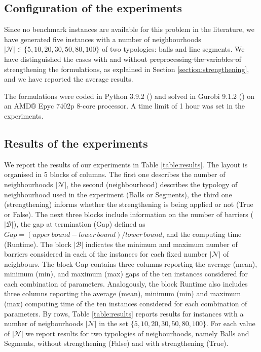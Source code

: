 \documentclass[a4paper,  review, authoryear, 1p.]{elsarticle}
\newcommand{\CV}[1]{{\color{red}#1}}
\begin{document}
	\subsection{Configuration of the experiments}
	Since no benchmark instances are available for this problem in the literature, we have generated five instances with a number of neighbourhoods $|\mathcal N|\in\{5, 10, 20, 30, 50, 80, 100\}$ of two typologies: balls and line segments. We have distinguished the cases with and without \sout{preprocessing the variables of} \CV{strengthening} the formulations, as explained in Section \ref{section:strengthening}, and we have reported the average results. 
	
	The formulations were coded in Python 3.9.2 (\citet{g_van_rossum_guido_python_1995}) and solved in Gurobi 9.1.2 (\citet{gurobi_optimization_llc_gurobi_2022}) on an AMD® Epyc 7402p 8-core processor. A time limit of 1 hour was set in the experiments.
	
	\subsection{Results of the experiments}
	We report the results of our experiments in Table \ref{table:results}. The layout is organised in 5 blocks of columns. The first one describes the number of neighbourhoods $|\mathcal{N}|$, the second (neighbourhood) describes the typology of neighbourhood used in the experiment (Balls or Segments), the third one (strengthening)  informs whether the strengthening is being applied or not (True or False). The next three blocks include information  on the number of barriers ($|\mathcal{B}|$), the  gap at termination (Gap) defined as $Gap=(upper\, bound - lower\, bound)/lower\, bound$, and the computing time (Runtime). The block $|\mathcal{B}|$ indicates the minimum and maximum number of barriers considered in each of the instances for each fixed number $|\mathcal{N}|$ of neighbours. The block Gap contains three columns reporting the average (mean), minimum (min), and maximum (max) gaps of the ten instances considered for each combination of parameters. Analogously, the block Runtime also includes three columns reporting the average (mean), minimum (min) and maximum (max) computing time of the ten instances considered for each combination of parameters.
	By rows, Table \ref{table:results} reports results for instances with a number of neigbourhoods $|\mathcal{N}|$ in the set $\{5,10,20,30,50,80,100\}$. For each value of $|\mathcal{N}|$  we report results for two typologies of neigbourhoods, namely Balls and Segments, without strengthening (False) and with strengthening (True).
	
\end{document}

